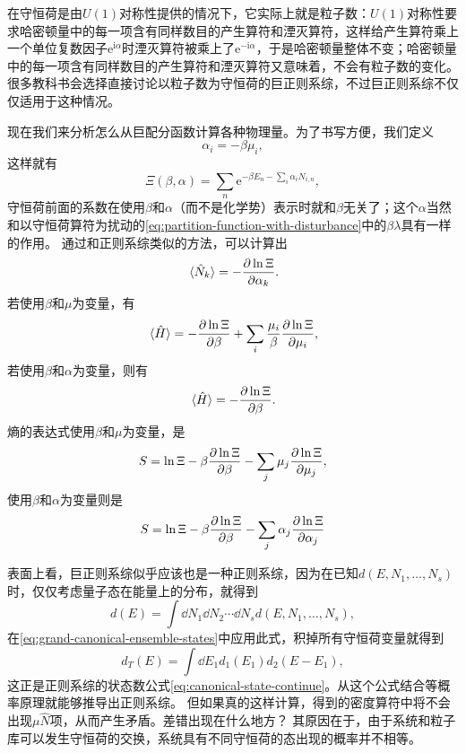 \documentclass[hyperref, UTF8, a4paper]{ctexart}
\newcommand*{\ii}{\mathrm{i}}
\newcommand*{\ee}{\mathrm{e}}
\begin{document}
在守恒荷是由$U(1)$对称性提供的情况下，它实际上就是粒子数：$U(1)$对称性要求哈密顿量中的每一项含有同样数目的产生算符和湮灭算符，这样给产生算符乘上一个单位复数因子$\ee^{\ii \alpha}$时湮灭算符被乘上了$\ee^{ - \ii \alpha}$，于是哈密顿量整体不变；哈密顿量中的每一项含有同样数目的产生算符和湮灭算符又意味着，不会有粒子数的变化。
很多教科书会选择直接讨论以粒子数为守恒荷的巨正则系综，不过巨正则系综不仅仅适用于这种情况。

现在我们来分析怎么从巨配分函数计算各种物理量。为了书写方便，我们定义
\begin{equation}
    \alpha_i = - \beta \mu_i,
\end{equation}
这样就有
\begin{equation}
    \Xi(\beta, \alpha) = \sum_n \ee^{-\beta E_n - \sum_i \alpha_i N_{i,n}},
\end{equation}
守恒荷前面的系数在使用$\beta$和$\alpha$（而不是化学势）表示时就和$\beta$无关了；这个$\alpha$当然和以守恒荷算符为扰动的\eqref{eq:partition-function-with-disturbance}中的$\beta\lambda$具有一样的作用。
通过和正则系综类似的方法，可以计算出
\begin{equation}
    \expval*{\hat{N}_k} = - \pdv{\ln \Xi}{\alpha_k}.
    \label{eq:expectation-of-charge-grand}
\end{equation}
若使用$\beta$和$\mu$为变量，有
\begin{equation}
    \expval*{\hat{H}} = - \pdv{\ln \Xi}{\beta} + \sum_i \frac{\mu_i}{\beta} \pdv{\ln \Xi}{\mu_i},
\end{equation}
若使用$\beta$和$\alpha$为变量，则有
\begin{equation}
    \expval*{\hat{H}} = - \pdv{\ln \Xi}{\beta}.
    \label{eq:expactation-of-energy-grand}
\end{equation}
熵的表达式使用$\beta$和$\mu$为变量，是
\begin{equation}
    S = \ln \Xi - \beta \pdv{\ln \Xi}{\beta} - \sum_j \mu_j \pdv{\ln \Xi}{\mu_j},
\end{equation}
使用$\beta$和$\alpha$为变量则是
\begin{equation}
    S = \ln \Xi - \beta \pdv{\ln \Xi}{\beta} - \sum_j \alpha_j \pdv{\ln \Xi}{\alpha_j}
\end{equation}

表面上看，巨正则系综似乎应该也是一种正则系综，因为在已知$d(E, N_1, \ldots, N_s)$时，仅仅考虑量子态在能量上的分布，就得到
\[
    d(E) = \int \dd{N_1} \dd{N_2} \cdots \dd{N_s} d(E, N_1, \ldots, N_s),
\]
在\eqref{eq:grand-canonical-ensemble-states}中应用此式，积掉所有守恒荷变量就得到
\[
    d_T(E) = \int \dd{E_1} d_1(E_1) d_2(E-E_1),
\]
这正是正则系综的状态数公式\eqref{eq:canonical-state-continue}。从这个公式结合等概率原理就能够推导出正则系综。
但如果真的这样计算，得到的密度算符中将不会出现$\mu \hat{N}$项，从而产生矛盾。差错出现在什么地方？
其原因在于，由于系统和粒子库可以发生守恒荷的交换，系统具有不同守恒荷的态出现的概率并不相等。
\end{document}
